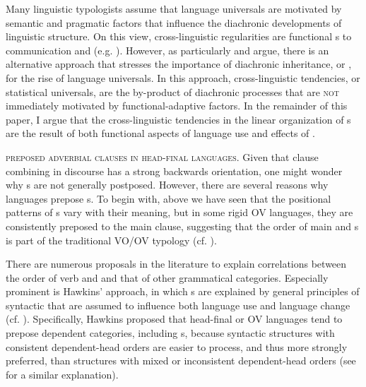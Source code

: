 \documentclass[output=paper]{langsci/langscibook}
\begin{document}
Many linguistic typologists assume that language universals are motivated by semantic and pragmatic factors that influence the diachronic developments of linguistic structure. On this view, cross-linguistic regularities are functional s to communication and  (e.g. \citealt{FoleyVanValin1984,Dik1989,Hawkins2004}). However, as particularly  and  argue, there is an alternative approach that stresses the importance of diachronic inheritance, or , for the rise of language universals. In this approach, cross-linguistic tendencies, or statistical universals, are the by-product of diachronic processes that are \textsc{not} immediately motivated by functional-adaptive factors. In the remainder of this paper, I argue that the cross-linguistic tendencies in the linear organization of s are the result of both functional aspects of language use and  effects of . 

\textsc{preposed} \textsc{adverbial} \textsc{clauses} \textsc{in} \textsc{head-final} \textsc{languages}. Given that clause combining in discourse has a strong backwards orientation, one might wonder why s are not generally postposed. However, there are several reasons why languages prepose s. To begin with, above we have seen that the positional patterns of s vary with their meaning, but in some rigid OV languages, they are consistently preposed to the main clause, suggesting that the order of main and s is part of the traditional VO/OV typology (cf. \citealt{Diessel2001}).

There are numerous proposals in the literature to explain correlations between the order of verb and  and that of other grammatical categories. Especially prominent is Hawkins’  approach, in which s are explained by general principles of syntactic  that are assumed to influence both language use and language change (cf. \citealt{Hawkins1994, Hawkins2004}). Specifically, Hawkins proposed that head-final or OV languages tend to prepose dependent categories, including s, because syntactic structures with consistent dependent-head orders are easier to process, and thus more strongly preferred, than structures with mixed or inconsistent dependent-head orders (see \citealt{Dryer1992} for a similar explanation).
\end{document}
